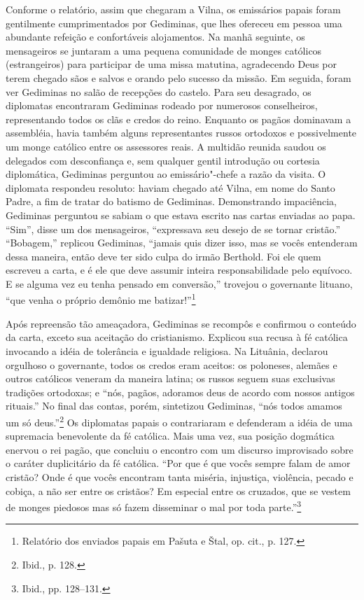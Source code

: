 Conforme o relatório, assim que chegaram a Vilna, os emissários papais
foram gentilmente cumprimentados por Gediminas, que lhes ofereceu em
pessoa uma abundante refeição e confortáveis alojamentos. Na manhã
seguinte, os mensageiros se juntaram a uma pequena comunidade de monges
católicos (estrangeiros) para participar de uma missa matutina,
agradecendo Deus por terem chegado sãos e salvos e orando pelo sucesso
da missão. Em seguida, foram ver Gediminas no salão de recepções do
castelo. Para seu desagrado, os diplomatas encontraram Gediminas rodeado
por numerosos conselheiros, representando todos os clãs e credos do
reino. Enquanto os pagãos dominavam a assembléia, havia também alguns
representantes russos ortodoxos e possivelmente um monge católico entre
os assessores reais. A multidão reunida saudou os delegados com
desconfiança e, sem qualquer gentil introdução ou cortesia diplomática,
Gediminas perguntou ao emissário"-chefe a razão da visita. O diplomata
respondeu resoluto: haviam chegado até Vilna, em nome do Santo Padre, a
fim de tratar do batismo de Gediminas. Demonstrando impaciência,
Gediminas perguntou se sabiam o que estava escrito nas cartas enviadas
ao papa. ``Sim'', disse um dos mensageiros, ``expressava seu desejo de
se tornar cristão.'' ``Bobagem,'' replicou Gediminas, ``jamais quis
dizer isso, mas se vocês entenderam dessa maneira, então deve ter sido
culpa do irmão Berthold. Foi ele quem escreveu a carta, e é ele que deve
assumir inteira responsabilidade pelo equívoco. E se alguma vez eu tenha
pensado em conversão,'' trovejou o governante lituano, ``que venha o
próprio demônio me batizar!''\footnote{Relatório dos enviados papais em
  Pašuta e Štal, op. cit., p. 127.}

Após repreensão tão ameaçadora, Gediminas se recompôs e confirmou o
conteúdo da carta, exceto sua aceitação do cristianismo. Explicou sua
recusa à fé católica invocando a idéia de tolerância e igualdade
religiosa. Na Lituânia, declarou orgulhoso o governante, todos os credos
eram aceitos: os poloneses, alemães e outros católicos veneram da
maneira latina; os russos seguem suas exclusivas tradições ortodoxas; e
``nós, pagãos, adoramos deus de acordo com nossos antigos rituais.'' No
final das contas, porém, sintetizou Gediminas, ``nós todos amamos um só
deus.''\footnote{Ibid., p. 128.} Os diplomatas papais o contrariaram e
defenderam a idéia de uma supremacia benevolente da fé católica. Mais
uma vez, sua posição dogmática enervou o rei pagão, que concluiu o
encontro com um discurso improvisado sobre o caráter duplicitário da fé
católica. ``Por que é que vocês sempre falam de amor cristão? Onde é que
vocês encontram tanta miséria, injustiça, violência, pecado e cobiça, a
não ser entre os cristãos? Em especial entre os cruzados, que se vestem
de monges piedosos mas só fazem disseminar o mal por toda
parte.''\footnote{Ibid., pp. 128--131.}

